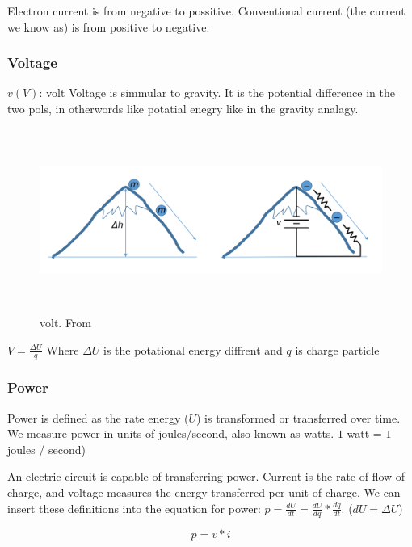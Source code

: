 Electron current is from negative to possitive. Conventional current (the current we know as) is from
positive to negative.

\subsubsection{Voltage}
$v (V)$: volt \newline
Voltage is simmular to gravity. It is the potential difference in the two pols, in otherwords
like potatial enegry like in the gravity analagy.

\begin{figure}[h]
    \vspace{10mm}
    \centering
    \includegraphics[width=15cm, height=6cm]{image/volt.png}
    \caption{volt. From \cite{}}
\end{figure}

$V=\frac{\Delta{U}}{q}$ Where $\Delta{U}$ is the potational energy diffrent and $q$ is charge particle

\newpage
\subsubsection{Power}
Power is defined as the rate energy ($U$) is transformed or transferred over time. We measure power in units of joules/second, also known as watts.
$1$ watt = $1$ joules / second) \newline

An electric circuit is capable of transferring power. Current is the rate of flow of charge, and voltage measures the energy transferred per unit of charge. We can insert these definitions into the equation for power:
$p = \frac{dU}{dt} = \frac{dU}{dq} * \frac{dq}{dt}$. ($dU=\Delta{U}$)

\begin{equation} p = v*i \end{equation}

